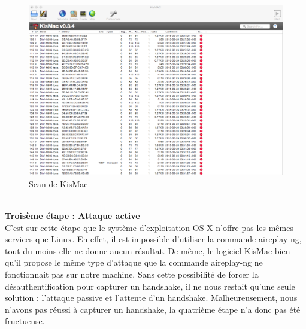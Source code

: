 \documentclass[11pt]{article}
\begin{document}
\begin{figure}[hbtp]
        \centering \includegraphics[scale=0.4]{Exercice1/reseauKM.png}
        \caption{Scan de KisMac}
         \label{fig:reseauKM}
\end{figure}
~\\
\textbf{Troisème étape : Attaque active}~\\
C'est sur cette étape que le système d'exploitation OS X n'offre pas les mêmes services que Linux. En effet, il est impossible d'utiliser la commande aireplay-ng, tout du moins elle ne donne aucun résultat. De même, le logiciel KisMac bien qu'il propose le même type d'attaque que la commande aireplay-ng ne fonctionnait pas sur notre machine. 
Sans cette possibilité de forcer la désauthentification pour capturer un handshake, il ne nous restait qu'une seule solution : l'attaque passive et l'attente d'un handshake.
Malheureusement, nous n'avons pas réussi à capturer un handshake, la quatrième étape n'a donc pas été fructueuse.~\\
\end{document}
